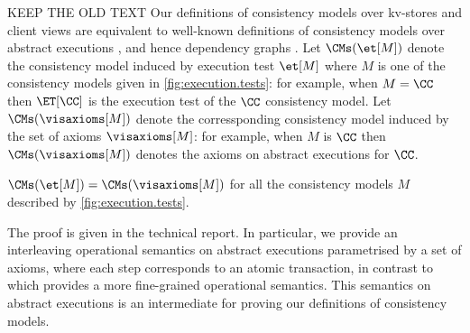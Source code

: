 \begin{sx}
KEEP THE OLD TEXT
Our definitions of consistency models over kv-stores
and client views are equivalent to well-known definitions of
consistency models over abstract executions \cite{framework-concur}, and hence dependency graphs \cite{laws}.
Let $\CMs(\et[M])$ denote the consistency model induced by execution test
$\et[M]$ where $M$ is one of the consistency models given in \cref{fig:execution.tests}:
for example, when $M=\CC$ then $\ET[\CC]$ is the execution test of the \( \CC \)
consistency model. Let $\CMs(\visaxioms[M])$ denote the corressponding consistency
model induced by the set of axioms $\visaxioms[M]$: for example, when $M$ is \( \CC \)
then $\CMs(\visaxioms[M])$ denotes the axioms on abstract executions  for \( \CC \). 

\SpaceAboveDef
\begin{theorem}
$ \CMs(\et[M]) = \CMs(\visaxioms[M])$ for all the consistency models $M$
described by \cref{fig:execution.tests}. 
\end{theorem}
\SpaceBelowDef

The proof is given in the technical report. 
In particular, we provide an interleaving operational semantics on
abstract executions parametrised by a set of axioms,  where each step
corresponds to an atomic transaction, 
in  contrast to \cite{sureshConcur} which provides a more fine-grained
operational semantics. 
This semantics on abstract executions is an intermediate  for proving our definitions of consistency models.
\end{sx}
